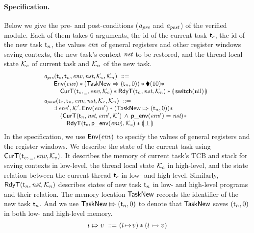 \paragraph{\textbf{Specification.}}
Below we give the pre- and post-conditions
($\textit{a}_\textit{pre}$ and $\textit{a}_\textit{post}$) of the verified module.
Each of them takes 6 arguments, 
the id of the current task $\textsf{t}_c$, the id of the new 
task $\textsf{t}_n$, the values $\textit{env}$ of general registers and 
other register windows saving contexts, 
the new task's context $\textit{nst}$ to be restored, 
and the thread local state $\mathcal{K}_c$
of current task and $\mathcal{K}_n$ of the new task.
\[
    \small
    \begin{array}{l}
        \textit{a}_\textit{pre}(\textsf{t}_c, \textsf{t}_n, \textit{env}, \textit{nst}, \mathcal{K}_c, \mathcal{K}_n)
        \ ::\!\!{=} \\
        \quad
        \begin{array}{l}
            \mathsf{Env}({\textit{env}}) *
            ({\mathsf{TaskNew}}\Mapsto{(\textsf{t}_n, 0)}) * 
            \blacklozenge({10}) * \\
            \quad
            \textsf{CurT}({\textsf{t}_c}, {\underline{\ \,}}, {\textit{env}}, {\mathcal{K}_c}) * 
            \textsf{RdyT}({\textsf{t}_n}, {\textit{nst}}, {\mathcal{K}_n}) * 
            \llparenthesis {\, \mathsf{switch}(\text{nil}) \,} \rrparenthesis
        \end{array}
        \\
        \\[-8pt]
        \textit{a}_\textit{post}(\textsf{t}_c, \textsf{t}_n, \textit{env}, \textit{nst}, \mathcal{K}_c, \mathcal{K}_n)
        \ ::\!\!{=} \\ 
        \quad
        \begin{array}{l}
            \exists \, \textit{env}', \mathcal{K}'. \, \mathsf{Env}({\textit{env}'}) 
            * ({\mathsf{TaskNew}}\Mapsto{(\textsf{t}_n, 0)}) 
            * \
            \\
            \quad
            (\textsf{CurT}({\textsf{t}_n}, {\textit{nst}}, {\textit{env}'}, {\mathcal{K}'})
            \,\land\,\mathsf{p\_env}({\textit{env}'}) = \textit{nst}) * 
            \\
            \qquad
            \textsf{RdyT}({\textsf{t}_c}, {\mathsf{p\_env}({\textit{env}})}, {\mathcal{K}_c}) * 
            \llparenthesis {\, \perp\,} \rrparenthesis
        \end{array}
    \end{array}
\]
In the specification,
we use $\mathsf{Env}({\textit{env}})$ to specify the values of
general registers and the register windows.
We describe the state
of the current task 
using $\textsf{CurT}({\textsf{t}_c}, {\underline{\ \,}}, {\textit{env}}, {\mathcal{K}_c})$. 
It describes the memory of current task's TCB 
and stack for saving contexts in low-level, 
the thread local state $\mathcal{K}_c$ in high-level, 
and the state relation between the current thread $\textsf{t}_c$ 
in low- and high-level. 
Similarly, $\textsf{RdyT}({\textsf{t}_n}, {\textit{nst}}, {\mathcal{K}_n})$  
describes states of new task $\textsf{t}_n$ in low- and high-level 
programs and their relation. 
The memory location 
$\mathsf{TaskNew}$ records the identifier of the new task $\textsf{t}_n$.  
And we use ${\mathsf{TaskNew}}\Mapsto{(\textsf{t}_n, 0)}$ to denote that
$\mathsf{TaskNew}$ saves $(\textsf{t}_n, 0)$ 
in both low- and high-level memory. 
\[
    \relmsto{\loc}{\val} \ \define \ 
    (\msto{\loc}{\val}) \sepstar (\hmsto{\loc}{\val})
\]

